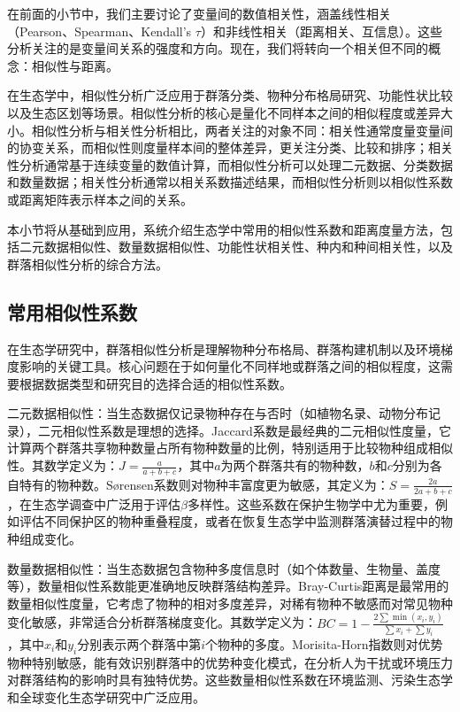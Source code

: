 \documentclass[
  twoside,12pt,fontset=none]{ctexbook}
\begin{document}
在前面的小节中，我们主要讨论了变量间的数值相关性，涵盖线性相关（Pearson、Spearman、Kendall's \(\tau\)）和非线性相关（距离相关、互信息）。这些分析关注的是变量间关系的强度和方向。现在，我们将转向一个相关但不同的概念：相似性与距离。

在生态学中，相似性分析广泛应用于群落分类、物种分布格局研究、功能性状比较以及生态区划等场景。相似性分析的核心是量化不同样本之间的相似程度或差异大小。相似性分析与相关性分析相比，两者关注的对象不同：相关性通常度量变量间的协变关系，而相似性则度量样本间的整体差异，更关注分类、比较和排序；相关性分析通常基于连续变量的数值计算，而相似性分析可以处理二元数据、分类数据和数量数据；相关性分析通常以相关系数描述结果，而相似性分析则以相似性系数或距离矩阵表示样本之间的关系。

本小节将从基础到应用，系统介绍生态学中常用的相似性系数和距离度量方法，包括二元数据相似性、数量数据相似性、功能性状相关性、种内和种间相关性，以及群落相似性分析的综合方法。

\hypertarget{ux5e38ux7528ux76f8ux4f3cux6027ux7cfbux6570}{%
\subsection{常用相似性系数}\label{ux5e38ux7528ux76f8ux4f3cux6027ux7cfbux6570}}

在生态学研究中，群落相似性分析是理解物种分布格局、群落构建机制以及环境梯度影响的关键工具。核心问题在于如何量化不同样地或群落之间的相似程度，这需要根据数据类型和研究目的选择合适的相似性系数。

二元数据相似性：当生态数据仅记录物种存在与否时（如植物名录、动物分布记录），二元相似性系数是理想的选择。Jaccard系数是最经典的二元相似性度量，它计算两个群落共享物种数量占所有物种数量的比例，特别适用于比较物种组成相似性。其数学定义为：\(J = \frac{a}{a+b+c}\)，其中\(a\)为两个群落共有的物种数，\(b\)和\(c\)分别为各自特有的物种数。Sørensen系数则对物种丰富度更为敏感，其定义为：\(S = \frac{2a}{2a+b+c}\)，在生态学调查中广泛用于评估\(\beta\)多样性。这些系数在保护生物学中尤为重要，例如评估不同保护区的物种重叠程度，或者在恢复生态学中监测群落演替过程中的物种组成变化。

数量数据相似性：当生态数据包含物种多度信息时（如个体数量、生物量、盖度等），数量相似性系数能更准确地反映群落结构差异。Bray-Curtis距离是最常用的数量相似性度量，它考虑了物种的相对多度差异，对稀有物种不敏感而对常见物种变化敏感，非常适合分析群落梯度变化。其数学定义为：\(BC = 1 - \frac{2\sum \min(x_i, y_i)}{\sum x_i + \sum y_i}\)，其中\(x_i\)和\(y_i\)分别表示两个群落中第\(i\)个物种的多度。Morisita-Horn指数则对优势物种特别敏感，能有效识别群落中的优势种变化模式，在分析人为干扰或环境压力对群落结构的影响时具有独特优势。这些数量相似性系数在环境监测、污染生态学和全球变化生态学研究中广泛应用。
\end{document}

